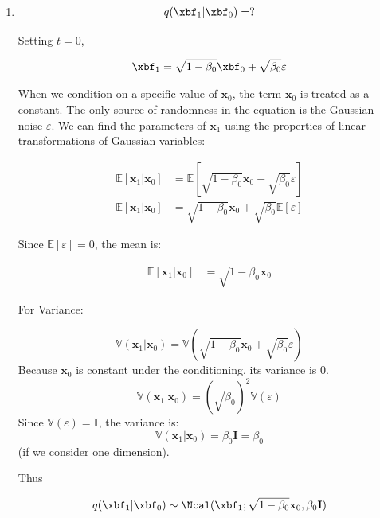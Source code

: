 \documentclass[12pt, xcolor=dvipsnames,svgnames,x11names]{article}
\begin{document}
\begin{enumerate}
Hence,

\begin{align*}
\Ebb[\xbf_{t+1}] = 0.9 ^{\frac{t+1}{2}}m\\
\Vbb[\xbf_{t+1}] = 0.9^{t+1}s + (1 - 0.9^{t+1} ) 
\end{align*}


\item 

\begin{align*}
q(\xbf_1 | \xbf_0) =?
\end{align*}


Setting $t = 0$, 


\begin{align*}
    \xbf_{1}  = \sqrt{1 - \beta_0}\xbf_0 + \sqrt{\beta_0}\varepsilon\\
\end{align*}

When we condition on a specific value of $\mathbf{x}_0$, the term $\mathbf{x}_0$ is treated as a constant. The only source of randomness in the equation is the Gaussian noise $\varepsilon$. We can find the parameters of $\mathbf{x}_1$ using the properties of linear transformations of Gaussian variables:

\begin{align*}
\mathbb{E}[\mathbf{x}_1 | \mathbf{x}_0] & = \mathbb{E}[\sqrt{1 - \beta_0}\mathbf{x}_0 + \sqrt{\beta_0}\varepsilon]\\
\mathbb{E}[\mathbf{x}_1 | \mathbf{x}_0] & = \sqrt{1 - \beta_0}\mathbf{x}_0 + \sqrt{\beta_0}\mathbb{E}[\varepsilon]
\end{align*}

Since $\mathbb{E}[\varepsilon] = 0$, the mean is:

\begin{align*}
\mathbb{E}[\mathbf{x}_1 | \mathbf{x}_0] & = \sqrt{1 - \beta_0}\mathbf{x}_0 
\end{align*}

For Variance:

$$\mathbb{V}(\mathbf{x}_1 | \mathbf{x}_0) = \mathbb{V}(\sqrt{1 - \beta_0}\mathbf{x}_0 + \sqrt{\beta_0}\varepsilon)$$Because $\mathbf{x}_0$ is constant under the conditioning, its variance is 0.$$\mathbb{V}(\mathbf{x}_1 | \mathbf{x}_0) = (\sqrt{\beta_0})^2 \mathbb{V}(\varepsilon)$$Since $\mathbb{V}(\varepsilon) = \mathbf{I}$, the variance is:$$\mathbb{V}(\mathbf{x}_1 | \mathbf{x}_0)  = \beta_0 \mathbf{I} = \beta_0$$ (if we consider one dimension).

Thus


\begin{align*}
q(\xbf_1 | \xbf_0) \sim \Ncal( \xbf_1;  \sqrt{1 - \beta_0}\mathbf{x}_0 , \beta_0 \mathbf{I})
\end{align*}



\end{enumerate}
\end{document}
